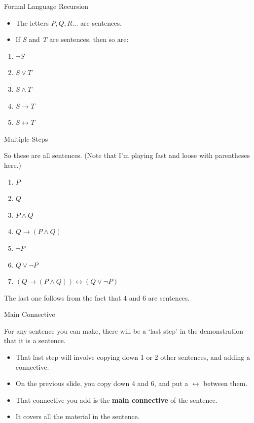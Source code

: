 \documentclass[
  ignorenonframetext,
]{beamer}
\providecommand{\tightlist}{%
  \setlength{\itemsep}{0pt}\setlength{\parskip}{0pt}}
\renewcommand{\,}{\text{, }}
\begin{document}
\begin{frame}{Formal Language Recursion}
\protect\hypertarget{formal-language-recursion}{}

\begin{itemize}
\tightlist
\item
  The letters \(P, Q, R...\) are sentences.
\item
  If \emph{S} and \emph{T} are sentences, then so are:
\end{itemize}

\begin{enumerate}
\tightlist
\item
  \(\neg S\)
\item
  \(S \vee T\)
\item
  \(S \wedge T\)
\item
  \(S \rightarrow T\)
\item
  \(S \leftrightarrow T\)
\end{enumerate}

\end{frame}

\begin{frame}{Multiple Steps}
\protect\hypertarget{multiple-steps}{}

So these are all sentences. (Note that I'm playing fast and loose with
parentheses here.)

\begin{enumerate}
\tightlist
\item
  \(P\)
\item
  \(Q\)
\item
  \(P \wedge Q\)
\item
  \(Q \rightarrow (P \wedge Q)\)
\item
  \(\neg P\)
\item
  \(Q \vee \neg P\)
\item
  \((Q \rightarrow (P \wedge Q)) \leftrightarrow (Q \vee \neg P)\)
\end{enumerate}

The last one follows from the fact that 4 and 6 are sentences.

\end{frame}

\begin{frame}{Main Connective}
\protect\hypertarget{main-connective}{}

For any sentence you can make, there will be a `last step' in the
demonstration that it is a sentence.

\begin{itemize}
\tightlist
\item
  That last step will involve copying down 1 or 2 other sentences, and
  adding a connective.
\item
  On the previous slide, you copy down 4 and 6, and put a
  \(\leftrightarrow\) between them.
\item
  That connective you add is the \textbf{main connective} of the
  sentence.
\item
  It covers all the material in the sentence.
\end{itemize}

\end{frame}
\end{document}
